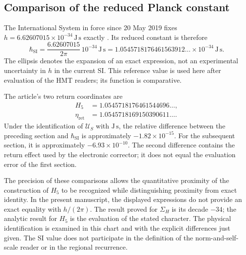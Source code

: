 \subsection{Comparison of the reduced Planck constant}
\label{sec:revision-planck-contraste}

The International System in force since 20 May 2019 fixes
\(h=6.62607015\times10^{-34}\,\mathrm{J\,s}\) exactly
\cite{bipm2018}. Its reduced constant is therefore
\[
 \hbar_{\mathrm{SI}}=\frac{6.62607015}{2\pi}\,10^{-34}\,\mathrm{J\,s}
 =1.0545718176461563912\ldots\times10^{-34}\,\mathrm{J\,s}.
\]
The ellipsis denotes the expansion of an exact expression,
not an experimental uncertainty in \(h\) in the current SI.
This reference value is used here after evaluation of the
HMT readers; its function is comparative.

The article's two return coordinates are
\begin{align*}
 H_5&=1.0545718176461544696\ldots,\\
 \eta_{\mathrm{ret}}&=1.0545718169150390611\ldots.
\end{align*}
Under the identification of \(\mathcal U_S\) with \(\mathrm{J\,s}\), the
relative difference between the preceding section and
\(\hbar_{\mathrm{SI}}\) is approximately \(-1.82\times10^{-15}\).
For the subsequent section, it is approximately \(-6.93\times10^{-10}\).
The second difference contains the return effect used by the
electronic corrector; it does not equal the evaluation error of the
first section.

The precision of these comparisons allows the quantitative proximity
of the construction of \(H_5\) to be recognized while distinguishing
proximity from exact identity. In the present manuscript, the displayed
expressions do not provide an exact equality with \(h/(2\pi)\).
The result proved for \(\Sigma_H\) is its decade \(-34\);
the analytic result for \(H_5\) is the evaluation of the stated
character. The physical identification is examined in this chart and with the
explicit differences just given. The SI value does not participate
in the definition of the norm-and-self-scale reader or in the regional recurrence.
